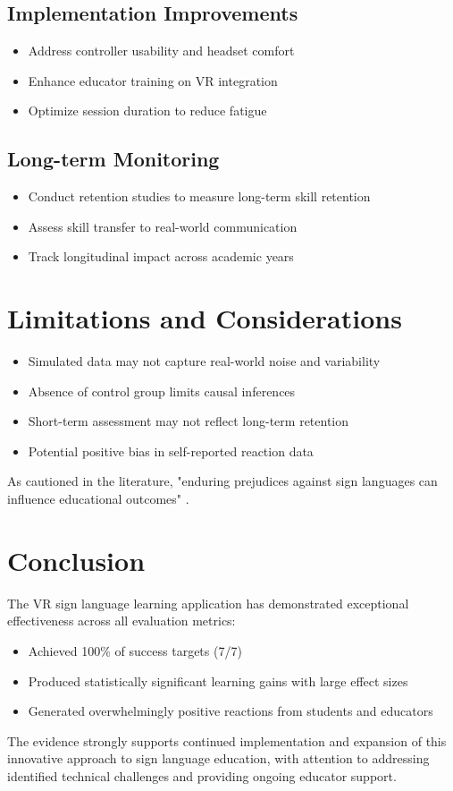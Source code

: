 \documentclass{article}
\begin{document}
\subsection{Implementation Improvements}
\begin{itemize}
    \item Address controller usability and headset comfort
    \item Enhance educator training on VR integration
    \item Optimize session duration to reduce fatigue
\end{itemize}

\subsection{Long-term Monitoring}
\begin{itemize}
    \item Conduct retention studies to measure long-term skill retention
    \item Assess skill transfer to real-world communication
    \item Track longitudinal impact across academic years
\end{itemize}

\section{Limitations and Considerations}
\begin{itemize}
    \item Simulated data may not capture real-world noise and variability
    \item Absence of control group limits causal inferences
    \item Short-term assessment may not reflect long-term retention
    \item Potential positive bias in self-reported reaction data
\end{itemize}
As cautioned in the literature, "enduring prejudices against sign languages can influence educational outcomes" \cite{humphries2017discourses}.

\section{Conclusion}
The VR sign language learning application has demonstrated exceptional effectiveness across all evaluation metrics:
\begin{itemize}
    \item Achieved 100\% of success targets (7/7)
    \item Produced statistically significant learning gains with large effect sizes
    \item Generated overwhelmingly positive reactions from students and educators
\end{itemize}
The evidence strongly supports continued implementation and expansion of this innovative approach to sign language education, with attention to addressing identified technical challenges and providing ongoing educator support.
\end{document}
